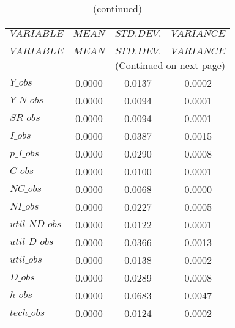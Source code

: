  
\begin{center}
\begin{longtable}{lccc} 
\caption{THEORETICAL MOMENTS}\\
 \label{Table:th_moments}\\
\toprule 
$VARIABLE       $	 & 	 $         MEAN$	 & 	 $    STD. DEV.$	 & 	 $     VARIANCE$\\
\midrule \endfirsthead 
\caption{(continued)}\\
 \toprule \\ 
$VARIABLE       $	 & 	 $         MEAN$	 & 	 $    STD. DEV.$	 & 	 $     VARIANCE$\\
\midrule \endhead 
\midrule \multicolumn{4}{r}{(Continued on next page)} \\ \bottomrule \endfoot 
\bottomrule \endlastfoot 
$Y\_obs         $	 & 	       0.0000	 & 	       0.0137	 & 	       0.0002 \\ 
$Y\_N\_obs      $	 & 	       0.0000	 & 	       0.0094	 & 	       0.0001 \\ 
$SR\_obs        $	 & 	       0.0000	 & 	       0.0094	 & 	       0.0001 \\ 
$I\_obs         $	 & 	       0.0000	 & 	       0.0387	 & 	       0.0015 \\ 
$p\_I\_obs      $	 & 	       0.0000	 & 	       0.0290	 & 	       0.0008 \\ 
$C\_obs         $	 & 	       0.0000	 & 	       0.0100	 & 	       0.0001 \\ 
$NC\_obs        $	 & 	       0.0000	 & 	       0.0068	 & 	       0.0000 \\ 
$NI\_obs        $	 & 	       0.0000	 & 	       0.0227	 & 	       0.0005 \\ 
$util\_ND\_obs  $	 & 	       0.0000	 & 	       0.0122	 & 	       0.0001 \\ 
$util\_D\_obs   $	 & 	       0.0000	 & 	       0.0366	 & 	       0.0013 \\ 
$util\_obs      $	 & 	       0.0000	 & 	       0.0138	 & 	       0.0002 \\ 
$D\_obs         $	 & 	       0.0000	 & 	       0.0289	 & 	       0.0008 \\ 
$h\_obs         $	 & 	       0.0000	 & 	       0.0683	 & 	       0.0047 \\ 
$tech\_obs      $	 & 	       0.0000	 & 	       0.0124	 & 	       0.0002 \\ 
\end{longtable}
 \end{center}
